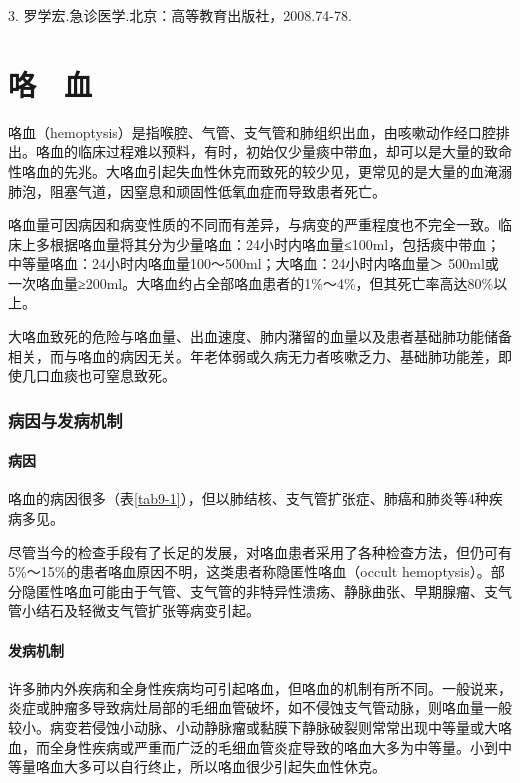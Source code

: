 3. 罗学宏.急诊医学.北京：高等教育出版社，2008.74-78.

\protect\hypertarget{text00024.html}{}{}

\chapter{咯　血}

咯血（hemoptysis）是指喉腔、气管、支气管和肺组织出血，由咳嗽动作经口腔排出。咯血的临床过程难以预料，有时，初始仅少量痰中带血，却可以是大量的致命性咯血的先兆。大咯血引起失血性休克而致死的较少见，更常见的是大量的血淹溺肺泡，阻塞气道，因窒息和顽固性低氧血症而导致患者死亡。

咯血量可因病因和病变性质的不同而有差异，与病变的严重程度也不完全一致。临床上多根据咯血量将其分为少量咯血：24小时内咯血量≤100ml，包括痰中带血；中等量咯血：24小时内咯血量100～500ml；大咯血：24小时内咯血量＞
500ml或一次咯血量≥200ml。大咯血约占全部咯血患者的1\%～4\%，但其死亡率高达80\%以上。

大咯血致死的危险与咯血量、出血速度、肺内潴留的血量以及患者基础肺功能储备相关，而与咯血的病因无关。年老体弱或久病无力者咳嗽乏力、基础肺功能差，即使几口血痰也可窒息致死。

\subsection{病因与发病机制}

\subsubsection{病因}

咯血的病因很多（表\ref{tab9-1}），但以肺结核、支气管扩张症、肺癌和肺炎等4种疾病多见。

尽管当今的检查手段有了长足的发展，对咯血患者采用了各种检查方法，但仍可有5\%～15\%的患者咯血原因不明，这类患者称隐匿性咯血（occult
hemoptysis）。部分隐匿性咯血可能由于气管、支气管的非特异性溃疡、静脉曲张、早期腺瘤、支气管小结石及轻微支气管扩张等病变引起。

\subsubsection{发病机制}

许多肺内外疾病和全身性疾病均可引起咯血，但咯血的机制有所不同。一般说来，炎症或肿瘤多导致病灶局部的毛细血管破坏，如不侵蚀支气管动脉，则咯血量一般较小。病变若侵蚀小动脉、小动静脉瘤或黏膜下静脉破裂则常常出现中等量或大咯血，而全身性疾病或严重而广泛的毛细血管炎症导致的咯血大多为中等量。小到中等量咯血大多可以自行终止，所以咯血很少引起失血性休克。

